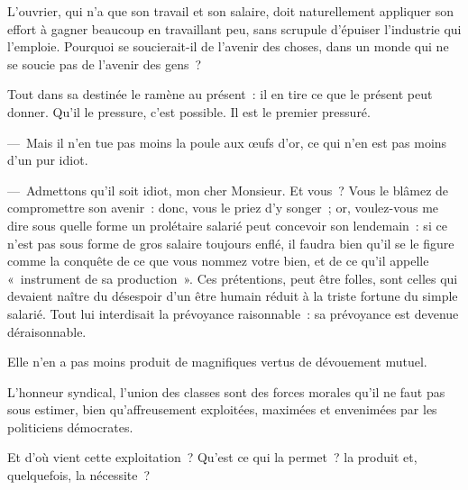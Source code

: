 \documentclass[french,twoside]{book} %
\newcommand{\astermono}{\medskip\centerline{\color{rubric}\large\selectfont{\syms ✻}}\medskip\par}%
\begin{document}
\astermono

\noindent L’ouvrier, qui n’a que son travail et son salaire, doit naturellement appliquer son effort à gagner beaucoup en travaillant peu, sans scrupule d’épuiser l’industrie qui l’emploie. Pourquoi se soucierait-il de l’avenir des choses, dans un monde qui ne se soucie pas de l’avenir des gens ?\par
Tout dans sa destinée le ramène au présent : il en tire ce que le présent peut donner. Qu’il le pressure, c’est possible. Il est le premier pressuré.\par
— Mais il n’en tue pas moins la poule aux œufs d’or, ce qui n’en est pas moins d’un pur idiot.\par
— Admettons qu’il soit idiot, mon cher Monsieur. Et vous ? Vous le blâmez de compromettre son avenir : donc, vous le priez d’y songer ; or, voulez-vous me dire sous quelle forme un prolétaire salarié peut concevoir son lendemain : si ce n’est pas sous forme de gros salaire toujours enflé, il faudra bien qu’il se le figure comme la conquête de ce que vous nommez votre bien, et de ce qu’il appelle « instrument de sa production ». Ces prétentions, peut être folles, sont celles qui devaient naître du désespoir d’un être humain réduit à la triste fortune du simple salarié. Tout lui interdisait la prévoyance raisonnable : sa prévoyance est devenue déraisonnable.\par
Elle n’en a pas moins produit de magnifiques vertus de dévouement mutuel.\par
L’honneur syndical, l’union des classes sont des forces morales qu’il ne faut pas sous estimer, bien qu’affreusement exploitées, maximées et envenimées par les politiciens démocrates.\par
Et d’où vient cette exploitation ? Qu’est ce qui la permet ? la produit et, quelquefois, la nécessite ?\par

\astermono
\end{document}
